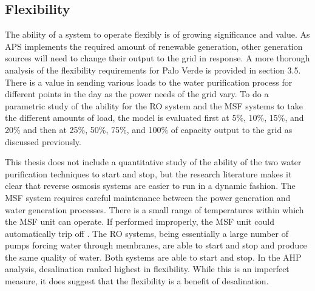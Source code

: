 \subsection{Flexibility}
The ability of a system to operate flexibly is of growing significance and value. As APS implements the required amount of renewable generation, other generation sources will need to change their output to the grid in response. A more thorough analysis of the flexibility requirements for Palo Verde is provided in section 3.5. There is a value in sending various loads to the water purification process for different points in the day as the power needs of the grid vary. To do a parametric study of the ability for the RO system and the MSF systems to take the different amounts of load, the model is evaluated first at 5\%, 10\%, 15\%, and 20\% and then at 25\%, 50\%, 75\%, and 100\% of capacity output to the grid as discussed previously.

This thesis does not include a quantitative study of the ability of the two water purification techniques to start and stop, but the research literature makes it clear that reverse osmosis systems are easier to run in a dynamic fashion.  The MSF system requires careful maintenance between the power generation and water generation processes.  There is a small range of temperatures within which the MSF unit can operate.  If performed improperly, the MSF unit could automatically trip off \cite{Radif}.  The RO systems, being essentially a large number of pumps forcing water through membranes, are able to start and stop and produce the same quality of water.  Both systems are able to start and stop.  In the AHP analysis, desalination ranked highest in flexibility. While this is an imperfect measure, it does suggest that the flexibility is a benefit of desalination.


